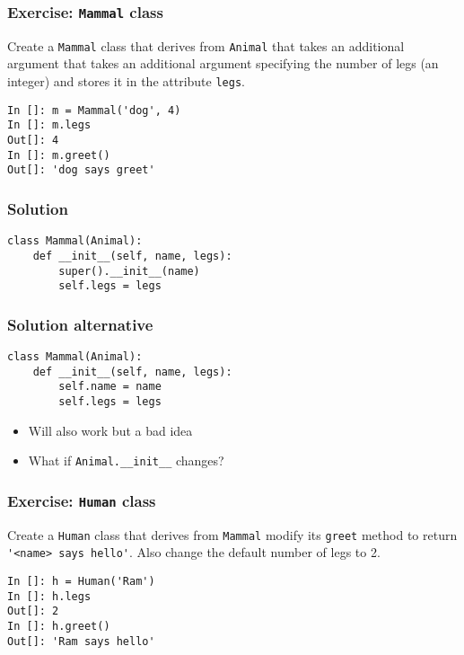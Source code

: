 \documentclass[14pt,compress,aspectratio=169]{beamer}
\begin{document}
\begin{frame}
  \frametitle{Exercise: \lstinline{Mammal} class}
  \begin{block}{}
    Create a \lstinline{Mammal} class that derives from \lstinline{Animal}
    that takes an additional argument that takes an additional argument
    specifying the number of legs (an integer) and stores it in the attribute
    \lstinline{legs}.
  \end{block}

\begin{lstlisting}
In []: m = Mammal('dog', 4)
In []: m.legs
Out[]: 4
In []: m.greet()
Out[]: 'dog says greet'
\end{lstlisting}
\end{frame}


\begin{frame}
  \frametitle{Solution}
\begin{lstlisting}
class Mammal(Animal):
    def __init__(self, name, legs):
        super().__init__(name)
        self.legs = legs
\end{lstlisting}
\end{frame}

\begin{frame}
  \frametitle{Solution alternative}
\begin{lstlisting}
class Mammal(Animal):
    def __init__(self, name, legs):
        self.name = name
        self.legs = legs
\end{lstlisting}
  \begin{itemize}
  \item Will also work but a \alert{bad} idea
  \item What if \lstinline{Animal.__init__} changes?
  \end{itemize}
\end{frame}

\begin{frame}
  \frametitle{Exercise: \lstinline{Human} class}
  \begin{block}{}
    Create a \lstinline{Human} class that derives from \lstinline{Mammal}
    modify its \lstinline{greet} method to return
    \lstinline{'<name> says hello'}.  Also change the default number of legs
    to 2.
  \end{block}

\begin{lstlisting}
In []: h = Human('Ram')
In []: h.legs
Out[]: 2
In []: h.greet()
Out[]: 'Ram says hello'
\end{lstlisting}
\end{frame}
\end{document}
